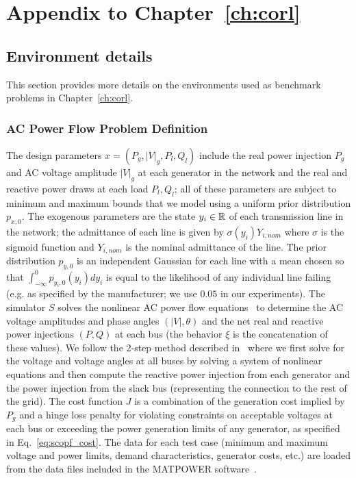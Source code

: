 \chapter{Appendix to Chapter~\ref{ch:corl}}

\section{Environment details}

This section provides more details on the environments used as benchmark problems in Chapter~\ref{ch:corl}.

\subsection{AC Power Flow Problem Definition}
The design parameters $x = (P_g, |V|_g, P_l, Q_l)$ include the real power injection $P_g$ and AC voltage amplitude $|V|_g$ at each generator in the network and the real and reactive power draws at each load $P_l, Q_l$; all of these parameters are subject to minimum and maximum bounds that we model using a uniform prior distribution $p_{x, 0}$. The exogenous parameters are the state $y_i \in \mathbb{R}$ of each transmission line in the network; the admittance of each line is given by $\sigma(y_i) Y_{i, nom}$ where $\sigma$ is the sigmoid function and $Y_{i, nom}$ is the nominal admittance of the line. The prior distribution $p_{y, 0}$ is an independent Gaussian for each line with a mean chosen so that $\int_{-\infty}^0 p_{y_i, 0}(y_i) dy_i$ is equal to the likelihood of any individual line failing (e.g. as specified by the manufacturer; we use $0.05$ in our experiments). The simulator $S$ solves the nonlinear AC power flow equations~\cite{cainHistoryOptimalPower2012} to determine the AC voltage amplitudes and phase angles $(|V|, \theta)$ and the net real and reactive power injections $(P, Q)$ at each bus (the behavior $\xi$ is the concatenation of these values). We follow the 2-step method described in~\cite{dontiDC3LearningMethod2021} where we first solve for the voltage and voltage angles at all buses by solving a system of nonlinear equations and then compute the reactive power injection from each generator and the power injection from the slack bus (representing the connection to the rest of the grid). The cost function $J$ is a combination of the generation cost implied by $P_g$ and a hinge loss penalty for violating constraints on acceptable voltages at each bus or exceeding the power generation limits of any generator, as specified in Eq.~\ref{eq:scopf_cost}. The data for each test case (minimum and maximum voltage and power limits, demand characteristics, generator costs, etc.) are loaded from the data files included in the MATPOWER software~\cite{zimmermanMATPOWERSteadyStateOperations2011}.

